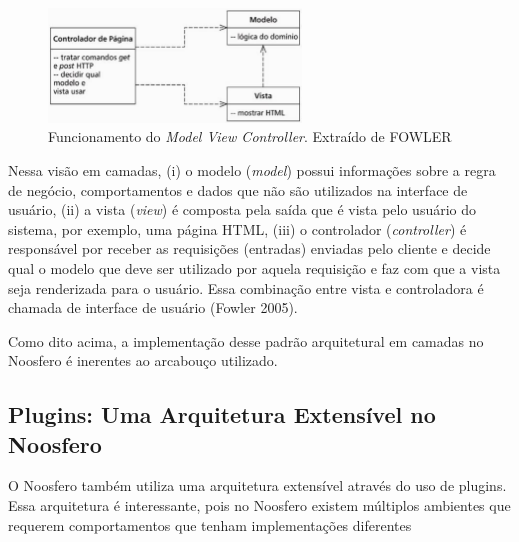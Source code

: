 \graphicspath{{figuras/}}
\begin{figure}[H]
\centering
\includegraphics[width=0.6\textwidth]{funcionamentomvc}
\caption[Funcionamento do \textit{Model View Controller}]{Funcionamento do \textit{Model View Controller}. Extraído de FOWLER}
\label{fig:arquiteturamvc}
\end{figure}

Nessa visão em camadas, (i) o modelo (\textit{model}) possui informações sobre a regra de negócio, comportamentos e dados que não são utilizados na interface de usuário, (ii) a vista (\textit{view}) é composta pela saída que é vista pelo usuário do sistema, por exemplo, uma página HTML, (iii) o controlador (\textit{controller}) é responsável por receber as requisições (entradas) enviadas pelo cliente e decide qual o modelo que deve ser utilizado por aquela requisição e faz com que a vista seja renderizada para o usuário. Essa combinação entre vista e controladora é chamada de interface de usuário (Fowler 2005).

Como dito acima, a implementação desse padrão arquitetural em camadas no Noosfero é inerentes ao arcabouço utilizado.

\subsection{Plugins: Uma Arquitetura Extensível no Noosfero}
\label{sub:arquiteturaplugin}
O Noosfero também utiliza uma arquitetura extensível através do uso de plugins. Essa arquitetura é interessante, pois no Noosfero existem múltiplos ambientes que requerem comportamentos que tenham implementações diferentes %

